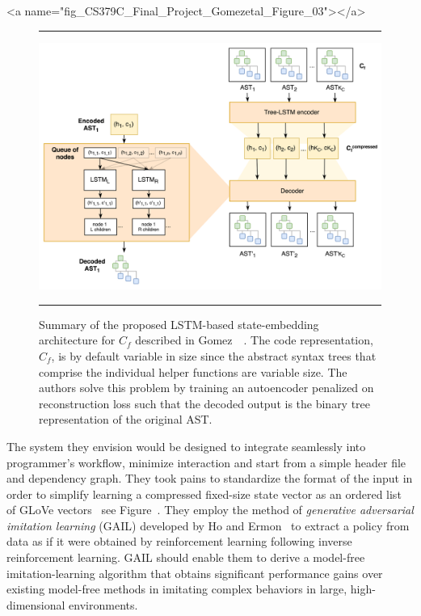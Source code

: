 
\setcounter{figure}{2}


\rawhtml
<a name="fig_CS379C_Final_Project_Gomezetal_Figure_03"></a>
\endrawhtml
\begin{figure}
%
  \hrule{}
%
  \begin{center}
    \includegraphics[width=11.0in]{./figures/CS379C_Final_Project_Gomezetal_Figure_03.png}
  \end{center}
%
  \caption{Summary of the proposed LSTM-based state-embedding architecture for $C_{f}$ described in Gomez~\etal{}~\cite{CS379C_Final_Project_Gomezetal-18}. The code representation, $C_{f}$, is by default variable in size since the abstract syntax trees that comprise the individual helper functions are variable size. The authors solve this problem by training an autoencoder penalized on reconstruction loss such that the decoded output is the binary tree representation of the original AST.}
%
  \hrule{}
%
\end{figure}


The system they envision would be designed to integrate seamlessly into programmer's workflow, minimize interaction and start from a simple header file and dependency graph. They took pains to standardize the format of the input in order to simplify learning a compressed fixed-size state vector as an ordered list of GLoVe vectors~\cite{PenningtonetalEMNLP-14} \emdash{} see Figure~{}. They employ the method of {\it{generative adversarial imitation learning}} (GAIL) developed by Ho and Ermon~\cite{HoandErmonCoRR-16} to extract a policy from data as if it were obtained by reinforcement learning following inverse reinforcement learning. GAIL should enable them to derive a model-free imitation-learning algorithm that obtains significant performance gains over existing model-free methods in imitating complex behaviors in large, high-dimensional environments.

